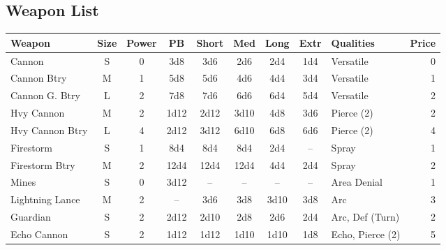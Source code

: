 \subsection{Weapon List}

\begin{center}
\begin{tabular}{|l|c|c|c|c|c|c|c|l|r|}
\hline
\textbf{Weapon} & \textbf{Size} & \textbf{Power} & \textbf{PB} & \textbf{Short} & \textbf{Med} & \textbf{Long} & \textbf{Extr} & \textbf{Qualities} & \textbf{Price} \\
\hline
Cannon & S & 0 & 3d8 & 3d6 & 2d6 & 2d4 & 1d4 & Versatile & 0 \\
Cannon Btry & M & 1 & 5d8 & 5d6 & 4d6 & 4d4 & 3d4 & Versatile & 1 \\
Cannon G. Btry & L & 2 & 7d8 & 7d6 & 6d6 & 6d4 & 5d4 & Versatile & 2 \\
Hvy Cannon & M & 2 & 1d12 & 2d12 & 3d10 & 4d8 & 3d6 & Pierce (2) & 2 \\
Hvy Cannon Btry & L & 4 & 2d12 & 3d12 & 6d10 & 6d8 & 6d6 & Pierce (2) & 4 \\
Firestorm & S & 1 & 8d4 & 8d4 & 8d4 & 2d4 & -- & Spray & 1 \\
Firestorm Btry & M & 2 & 12d4 & 12d4 & 12d4 & 4d4 & 2d4 & Spray & 2 \\
Mines & S & 0 & 3d12 & -- & -- & -- & -- & Area Denial & 1 \\
Lightning Lance & M & 2 & -- & 3d6 & 3d8 & 3d10 & 3d8 & Arc & 3 \\
Guardian & S & 2 & 2d12 & 2d10 & 2d8 & 2d6 & 2d4 & Arc, Def (Turn) & 2 \\
Echo Cannon & S & 2 & 1d12 & 1d12 & 1d10 & 1d10 & 1d8 & Echo, Pierce (2) & 5 \\
\hline
\end{tabular}
\end{center}

